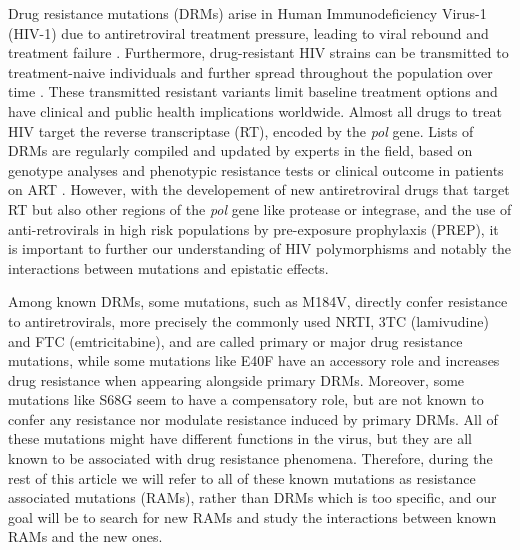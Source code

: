 \documentclass[
  11pt,
  twoside,
  BCOR=10mm,
  listof=totoc]{scrbook}
\begin{document}
Drug resistance mutations (DRMs) arise in Human Immunodeficiency Virus-1
(HIV-1) due to antiretroviral treatment pressure, leading to viral
rebound and treatment failure
\autocite{lepriResistanceProfilesPatients2000,verhofstedeDetectionDrugResistance2007}.
Furthermore, drug-resistant HIV strains can be transmitted to
treatment-naive individuals and further spread throughout the population
over time
\autocite{hueDemonstrationSustainedDrugResistant2009,mouradPhylotypebasedAnalysisHighlights2015,zhukovaRolePhylogeneticsTool2017}.
These transmitted resistant variants limit baseline treatment options
and have clinical and public health implications worldwide. Almost all
drugs to treat HIV target the reverse transcriptase (RT), encoded by the
\emph{pol} gene. Lists of DRMs are regularly compiled and updated by experts
in the field, based on genotype analyses and phenotypic resistance tests
or clinical outcome in patients on ART
\autocite{bennettDrugResistanceMutations2009,hammondMutationsRetroviralGenes1998,wensing2017UpdateDrug2016}.
However, with the developement of new antiretroviral drugs that target
RT but also other regions of the \emph{pol} gene like protease or integrase,
and the use of anti-retrovirals in high risk populations by pre-exposure
prophylaxis (PREP), it is important to further our understanding of HIV
polymorphisms and notably the interactions between mutations and
epistatic effects.

Among known DRMs, some mutations, such as M184V, directly confer
resistance to antiretrovirals, more precisely the commonly used NRTI,
3TC (lamivudine) and FTC (emtricitabine), and are called primary or
major drug resistance mutations, while some mutations like E40F have an
accessory role and increases drug resistance when appearing alongside
primary DRMs. Moreover, some mutations like S68G seem to have a
compensatory role, but are not known to confer any resistance nor
modulate resistance induced by primary DRMs. All of these mutations
might have different functions in the virus, but they are all known to
be associated with drug resistance phenomena. Therefore, during the rest
of this article we will refer to all of these known mutations as
resistance associated mutations (RAMs), rather than DRMs which is too
specific, and our goal will be to search for new RAMs and study the
interactions between known RAMs and the new ones.
\end{document}
